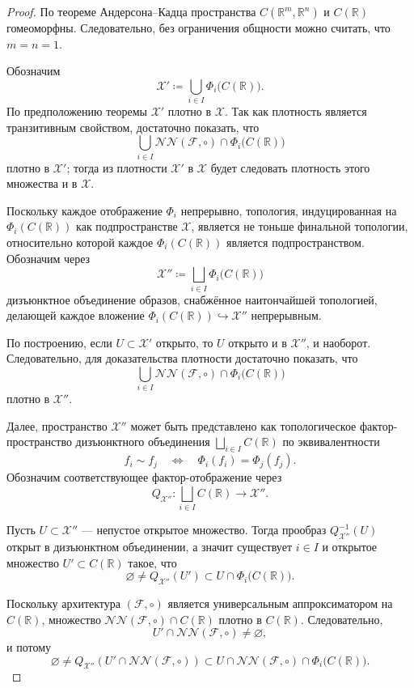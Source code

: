 \documentclass[../NDCNNAI_main.tex]{subfiles}
\begin{document}
\begin{proof}
По теореме Андерсона--Кадца \cite[Theorem~73]{AndersonKadec}
пространства $C(\mathbb{R}^m,\mathbb{R}^n)$ и $C(\mathbb{R})$ гомеоморфны.
Следовательно, без ограничения общности можно считать, что $m=n=1$.

Обозначим
\[
\mathcal{X}' \coloneq \bigcup_{i\in I} \Phi_i\bigl(C(\mathbb{R})\bigr).
\]
По предположению теоремы $\mathcal{X}'$ плотно в $\mathcal{X}$.
Так как плотность является транзитивным свойством, достаточно показать, что
\[
\bigcup_{i\in I}\mathcal{NN}(\mathcal{F},\circ)\cap \Phi_i\bigl(C(\mathbb{R})\bigr)
\]
плотно в $\mathcal{X}'$; тогда из плотности $\mathcal{X}'$ в $\mathcal{X}$ будет
следовать плотность этого множества и в $\mathcal{X}$.

Поскольку каждое отображение $\Phi_i$ непрерывно, топология,
индуцированная на $\Phi_i(C(\mathbb{R}))$ как подпространстве $\mathcal{X}$,
является не тоньше финальной топологии, относительно которой каждое
$\Phi_i(C(\mathbb{R}))$ является подпространством.
Обозначим через
\[
\mathcal{X}'' \coloneq \bigsqcup_{i\in I}\Phi_i\bigl(C(\mathbb{R})\bigr)
\]
дизъюнктное объединение образов, снабжённое наитончайшей топологией,
делающей каждое вложение $\Phi_i(C(\mathbb{R})) \hookrightarrow \mathcal{X}''$
непрерывным.

По построению, если $U\subset \mathcal{X}'$ открыто, то $U$ открыто и в
$\mathcal{X}''$, и наоборот.
Следовательно, для доказательства плотности достаточно показать, что
\[
\bigcup_{i\in I}\mathcal{NN}(\mathcal{F},\circ)\cap \Phi_i\bigl(C(\mathbb{R})\bigr)
\]
плотно в $\mathcal{X}''$.

Далее, пространство $\mathcal{X}''$ может быть представлено как
топологическое фактор-пространство дизъюнктного объединения
$\bigsqcup_{i\in I} C(\mathbb{R})$
по эквивалентности
\[
f_i \sim f_j
\quad\Longleftrightarrow\quad
\Phi_i(f_i)=\Phi_j(f_j).
\]
Обозначим соответствующее фактор-отображение через
\[
Q_{\mathcal{X}''}\colon \bigsqcup_{i\in I} C(\mathbb{R}) \longrightarrow \mathcal{X}''.
\]

Пусть $U\subset\mathcal{X}''$ --- непустое открытое множество.
Тогда прообраз $Q_{\mathcal{X}''}^{-1}(U)$ открыт в дизъюнктном объединении,
а значит существует $i\in I$ и открытое множество
$U'\subset C(\mathbb{R})$ такое, что
\[
\varnothing \neq Q_{\mathcal{X}''}(U') \subset U \cap \Phi_i\bigl(C(\mathbb{R})\bigr).
\]

Поскольку архитектура $(\mathcal{F},\circ)$ является универсальным
аппроксиматором на $C(\mathbb{R})$, множество
$\mathcal{NN}(\mathcal{F},\circ)\cap C(\mathbb{R})$
плотно в $C(\mathbb{R})$.
Следовательно,
\[
U' \cap \mathcal{NN}(\mathcal{F},\circ)\neq\varnothing,
\]
и потому
\[
\varnothing \neq
Q_{\mathcal{X}''}\!\left(
U' \cap \mathcal{NN}(\mathcal{F},\circ)
\right)
\subset
U \cap
\mathcal{NN}(\mathcal{F},\circ)\cap \Phi_i\bigl(C(\mathbb{R})\bigr).
\]


\end{proof}
\end{document}

